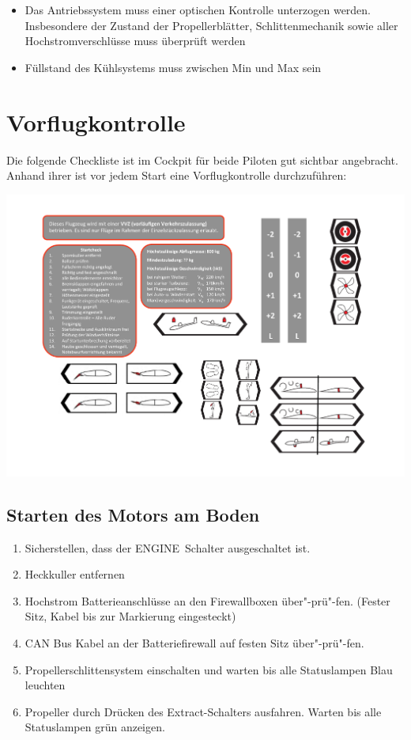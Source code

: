\begin{itemize}
\item Das Antriebssystem muss einer optischen Kontrolle unterzogen werden. Insbesondere der Zustand der Propellerblätter, Schlittenmechanik sowie aller Hochstromverschlüsse muss überprüft werden
\item  Füllstand des Kühlsystems muss zwischen Min und Max sein
\end{itemize}

\section{Vorflugkontrolle}
Die folgende Checkliste ist im Cockpit für beide Piloten gut sichtbar angebracht. Anhand ihrer ist vor jedem Start eine Vorflugkontrolle durchzuführen:
\begin{center}
\includegraphics[width=.45\textwidth]{bilder/startcheck.pdf}
\end{center}

\subsection{Starten des Motors am Boden}

\begin{enumerate}
\item Sicherstellen, dass der \glqq ENGINE\grqq\ Schalter ausgeschaltet ist.
\item Heckkuller entfernen
\item Hochstrom Batterieanschlüsse an den Firewallboxen über"-prü"-fen. (Fester Sitz, Kabel bis zur Markierung eingesteckt)
\item CAN Bus Kabel an der Batteriefirewall auf festen Sitz über"-prü"-fen.
\item Propellerschlittensystem einschalten und warten bis alle Statuslampen Blau leuchten
\item Propeller durch Drücken des \glqq Extract\grqq-Schalters ausfahren. Warten bis alle Statuslampen grün anzeigen.
\end{enumerate}

